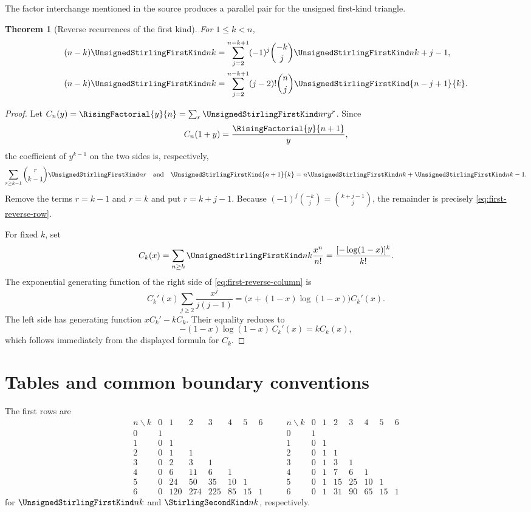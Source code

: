 \documentclass[11pt,a4paper,oneside,openany]{book}
\newtheorem{theorem}{Theorem}[chapter]
\theoremstyle{definition}
\theoremstyle{remark}
\begin{document}
The factor interchange mentioned in the source produces a parallel pair for the
unsigned first-kind triangle.

\begin{theorem}[Reverse recurrences of the first kind]
\label{thm:first-reverse-recurrences}
For $1\le k<n$,
\begin{align}
 (n-k)\UnsignedStirlingFirstKind nk
 &=\sum_{j=2}^{n-k+1}(-1)^j\binom{-k}{j}
   \UnsignedStirlingFirstKind n{k+j-1},
 \label{eq:first-reverse-row}\\
 (n-k)\UnsignedStirlingFirstKind nk
 &=\sum_{j=2}^{n-k+1}(j-2)!\binom nj
   \UnsignedStirlingFirstKind{n-j+1}{k}.
 \label{eq:first-reverse-column}
\end{align}
\end{theorem}
\begin{proof}
Let $C_n(y)=\RisingFactorial{y}{n}=\sum_r\UnsignedStirlingFirstKind nr y^r$.  Since
\[
 C_n(1+y)=\frac{\RisingFactorial{y}{n+1}}{y},
\]
the coefficient of $y^{k-1}$ on the two sides is, respectively,
\[
 \sum_{r\ge k-1}\binom r{k-1}\UnsignedStirlingFirstKind nr
 \quad\text{and}\quad
 \UnsignedStirlingFirstKind{n+1}{k}=n\UnsignedStirlingFirstKind nk+\UnsignedStirlingFirstKind n{k-1}.
\]
Remove the terms $r=k-1$ and $r=k$ and put $r=k+j-1$.  Because
$(-1)^j\binom{-k}{j}=\binom{k+j-1}{j}$, the remainder is precisely
\eqref{eq:first-reverse-row}.

For fixed $k$, set
\[
 C_k(x)=\sum_{n\ge k}\UnsignedStirlingFirstKind nk\frac{x^n}{n!}
       =\frac{[-\log(1-x)]^k}{k!}.
\]
The exponential generating function of the right side of
\eqref{eq:first-reverse-column} is
\[
 C_k'(x)\sum_{j\ge2}\frac{x^j}{j(j-1)}
 =\bigl(x+(1-x)\log(1-x)\bigr)C_k'(x).
\]
The left side has generating function $xC_k'-kC_k$.  Their equality reduces to
\[
 -(1-x)\log(1-x)\,C_k'(x)=kC_k(x),
\]
which follows immediately from the displayed formula for $C_k$.
\end{proof}
\section{Tables and common boundary conventions}
The first rows are
\[
\begin{array}{c|rrrrrrr}
 n\backslash k&0&1&2&3&4&5&6\\\hline
0&1\\
1&0&1\\
2&0&1&1\\
3&0&2&3&1\\
4&0&6&11&6&1\\
5&0&24&50&35&10&1\\
6&0&120&274&225&85&15&1
\end{array}
\qquad
\begin{array}{c|rrrrrrr}
 n\backslash k&0&1&2&3&4&5&6\\\hline
0&1\\
1&0&1\\
2&0&1&1\\
3&0&1&3&1\\
4&0&1&7&6&1\\
5&0&1&15&25&10&1\\
6&0&1&31&90&65&15&1
\end{array}
\]
for $\UnsignedStirlingFirstKind nk$ and $\StirlingSecondKind nk$, respectively.
\end{document}
